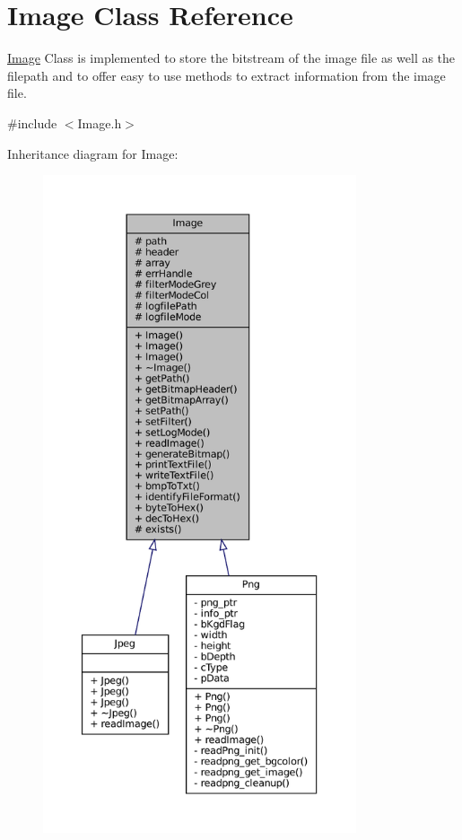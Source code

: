 \hypertarget{classImage}{}\section{Image Class Reference}
\label{classImage}


\mbox{\hyperlink{classImage}{Image}} Class is implemented to store the bitstream of the image file as well as the filepath and to offer easy to use methods to extract information from the image file.  




{\ttfamily \#include $<$Image.\+h$>$}



Inheritance diagram for Image\+:\nopagebreak
\begin{figure}[H]
\begin{center}
\leavevmode
\includegraphics[height=550pt]{classImage__inherit__graph}
\end{center}
\end{figure}


